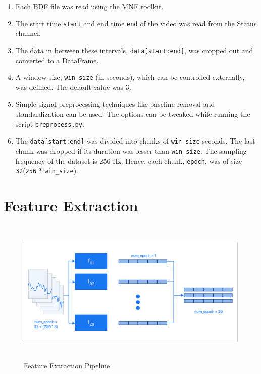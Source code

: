 \begin{enumerate}
\item Each BDF file was read using the MNE toolkit.
\item The start time \texttt{start} and end time \texttt{end} of the video was read from the Status channel.
\item The data in between these intervals, \texttt{data[start:end]}, was cropped out and converted to a DataFrame.
\item A window size, \texttt{win\_size} (in seconds), which can be controlled externally, was defined. The default value was 3.
\item Simple signal preprocessing techniques like baseline removal and standardization can be used. The options can be tweaked while running the script \texttt{preprocess.py}.
\item The \texttt{data[start:end]} was divided into chunks of \texttt{win\_size} seconds. The last chunk was dropped if its duration was lesser than \texttt{win\_size}. The sampling frequency of the dataset is 256 Hz. Hence, each chunk, \texttt{epoch}, was of size \texttt{32}\times(\texttt{256} * \texttt{win\_size}).
\end{enumerate}

\section{Feature Extraction}
\label{sec:featureExtraction}

\begin{figure}[H]
\centering
\includegraphics[height=7cm]{Figures/feat_extract.png}
\caption{Feature Extraction Pipeline}
\label{fig23}
\end{figure}

